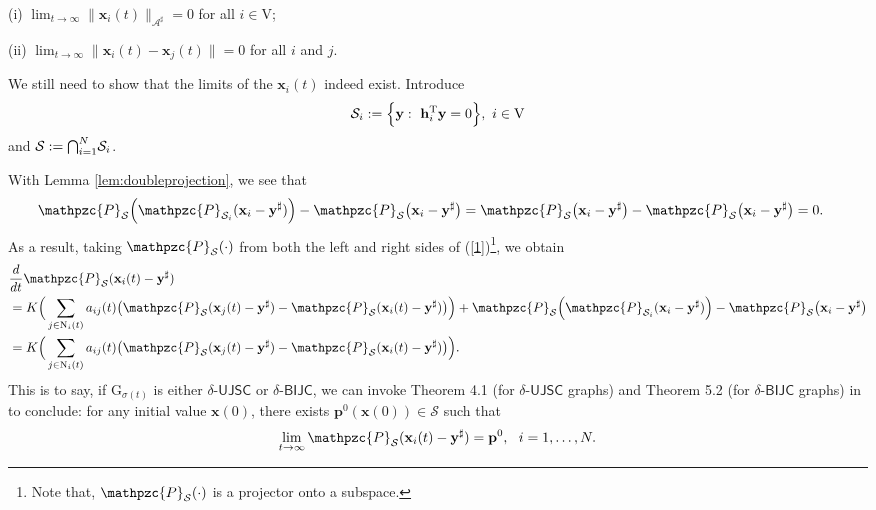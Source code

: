 \documentclass[a4paper, 11pt]{article}
\newcommand*\mcap{\mathbin{\mathpalette\mcapinn\relax}}
\newcommand*\mcapinn[2]{\vcenter{\hbox{$\mathsurround=0pt
  \ifx\displaystyle#1\textstyle\else#1\fi\bigcap$}}}
\def\T{^{\rm\tiny T}}
\begin{document}
(i) $\lim_{t\to \infty} \|\mathbf{x}_i(t)\|_{\mathcal{A}^\sharp}=0$ for all $i\in\mathrm{V}$;

(ii) $\lim_{t\to \infty} \|\mathbf{x}_i(t)-\mathbf{x}_j(t)\|=0$  for all $i$ and $j$.

 We still need to show that the limits of the $\mathbf{x}_i(t)$ indeed exist. Introduce
\begin{align*}
\mathcal{S}_i:=\Big\{\mathbf{y}:\ \mathbf{h}_i\T \mathbf{y}=0 \Big\},\ i\in\mathrm{V}
\end{align*}
and $\mathcal{S}:=\mcap_{i=1}^N \mathcal{S}_i$.

 With Lemma \ref{lem:doubleprojection},  we see that
 \begin{align}
 &\mathpzc{P}_{\mathcal{S}} \Big( \mathpzc{P}_{\mathcal{S}_i}(\mathbf{x}_i-\mathbf{y}^\sharp)\Big)-\mathpzc{P}_{\mathcal{S}} \big(\mathbf{x}_i-\mathbf{y}^\sharp\big)=\mathpzc{P}_{\mathcal{S}} \big(\mathbf{x}_i-\mathbf{y}^\sharp\big)-\mathpzc{P}_{\mathcal{S}} \big(\mathbf{x}_i-\mathbf{y}^\sharp\big)=0.
 \end{align}
 As a result, taking $\mathpzc{P}_{\mathcal{S}}(\cdot)$ from both the left and right sides of (\ref{1})\footnote{Note that, $\mathpzc{P}_{\mathcal{S}}(\cdot)$ is a projector onto a subspace.}, we obtain
\begin{align}\label{20}
&\frac{d}{dt} \mathpzc{P}_{\mathcal{S}}(\mathbf{x}_i(t)-\mathbf{y}^\sharp)\nonumber\\
&= K\Big( \sum_{j\in \mathrm{N}_i(t)}a_{ij}(t)\big(\mathpzc{P}_{\mathcal{S}}(\mathbf{x}_j(t)-\mathbf{y}^\sharp)-\mathpzc{P}_{\mathcal{S}}(\mathbf{x}_i(t)-\mathbf{y}^\sharp)\big) \Big) + \mathpzc{P}_{\mathcal{S}} \Big( \mathpzc{P}_{\mathcal{S}_i}(\mathbf{x}_i-\mathbf{y}^\sharp)\Big)-\mathpzc{P}_{\mathcal{S}} \big(\mathbf{x}_i-\mathbf{y}^\sharp\big)\nonumber\\
&= K\Big( \sum_{j\in \mathrm{N}_i(t)}a_{ij}(t)\big(\mathpzc{P}_{\mathcal{S}}(\mathbf{x}_j(t)-\mathbf{y}^\sharp)-\mathpzc{P}_{\mathcal{S}}(\mathbf{x}_i(t)-\mathbf{y}^\sharp)\big) \Big).
\end{align}
This is to say, if $\mathrm{G}_{\sigma(t)}$ is either  $\delta$-$\mathsf{UJSC}$ or $\delta$-$\mathsf{BIJC}$, we can invoke Theorem 4.1 (for $\delta$-$\mathsf{UJSC}$ graphs) and Theorem 5.2 (for $\delta$-$\mathsf{BIJC}$ graphs) in \cite{shisiam} to conclude:  for any initial value $\mathbf{x}(0)$, there exists $\mathbf{p}^0 (\mathbf{x}(0))\in\mathcal{S}$ such that
\begin{align}\label{5}
\lim_{t\rightarrow \infty}\mathpzc{P}_{\mathcal{S}}(\mathbf{x}_i(t)-\mathbf{y}^\sharp)=\mathbf{p}^0,\ \ i=1,\dots,N.
\end{align}
\end{document}

